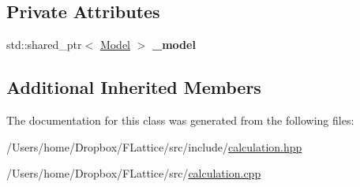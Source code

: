 \subsection*{Private Attributes}
\begin{DoxyCompactItemize}
\item 
\mbox{\label{class_calculate_energy_adb103d2c892ae25df1d14af57f0a2143}} 
std\+::shared\+\_\+ptr$<$ \mbox{\hyperlink{class_model}{Model}} $>$ {\bfseries \+\_\+model}
\end{DoxyCompactItemize}
\subsection*{Additional Inherited Members}


The documentation for this class was generated from the following files\+:\begin{DoxyCompactItemize}
\item 
/\+Users/home/\+Dropbox/\+F\+Lattice/src/include/\mbox{\hyperlink{calculation_8hpp}{calculation.\+hpp}}\item 
/\+Users/home/\+Dropbox/\+F\+Lattice/src/\mbox{\hyperlink{calculation_8cpp}{calculation.\+cpp}}\end{DoxyCompactItemize}
